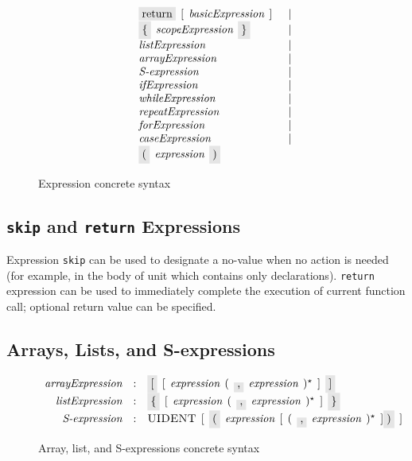 \begin{figure}[h]
\[\begin{array}{rcll}
                                  &   & \term{return}\s[\s\nonterm{basicExpression}\s]&\alt\\                                 
                                  &   & \term{\{}\s\nonterm{scopeExpression}\s\term{\}}&\alt\\
                                  &   & \nonterm{listExpression}&\alt\\
                                  &   & \nonterm{arrayExpression}&\alt\\
                                  &   & \nonterm{S-expression}&\alt\\
                                  &   & \nonterm{ifExpression}&\alt\\
                                  &   & \nonterm{whileExpression}&\alt\\
                                  &   & \nonterm{repeatExpression}&\alt\\
                                  &   & \nonterm{forExpression}&\alt\\
                                  &   & \nonterm{caseExpression}&\alt\\
                                  &   & \term{(}\s\nonterm{expression}\s\term{)}&
    \end{array}
  \]
  \caption{Expression concrete syntax}
  \label{expressions}
\end{figure}

\FloatBarrier
\subsection{\texttt{skip} and \texttt{return} Expressions}

Expression \lstinline|skip| can be used to designate a no-value when no action is needed (for example, in the body of unit which contains only declarations).
\lstinline|return| expression can be used to immediately complete the execution of current function call; optional return value can be specified.

\subsection{Arrays, Lists, and S-expressions}

\begin{figure}[h]
  \[
    \begin{array}{rcl}
      \defterm{arrayExpression} & : & \term{[}\s[\s\nonterm{expression}\s(\s\term{,}\s\nonterm{expression}\s)^\star\s]\s\term{]}\\
      \defterm{listExpression}  & : & \term{\{}\s[\s\nonterm{expression}\s(\s\term{,}\s\nonterm{expression}\s)^\star\s]\s\term{\}}\\
      \defterm{S-expression}    & : & \token{UIDENT}\s[\s\term{(}\s\nonterm{expression}\s[\s(\s\term{,}\s\nonterm{expression}\s)^\star\s]\term{)}\s]
    \end{array}
  \]
  \caption{Array, list, and S-expressions concrete syntax}  
  \label{composite_expressions}
\end{figure}

